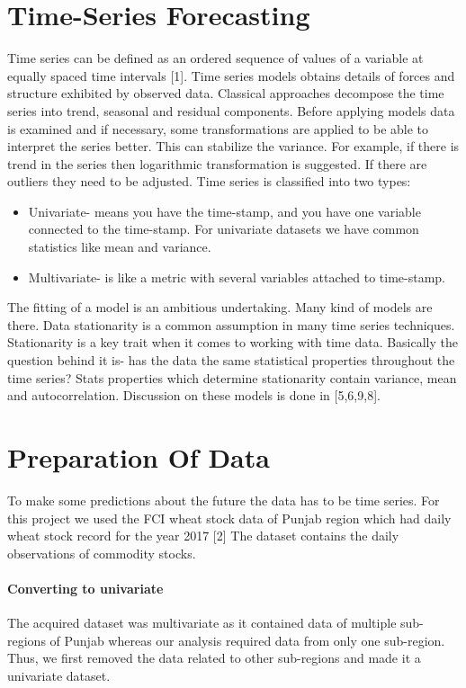 \documentclass[runningheads]{llncs}
\begin{document}
\section{Time-Series Forecasting}
Time series can be defined as an ordered sequence of values of a variable at equally spaced time intervals [1]. Time series models obtains details of forces and structure exhibited by observed data. Classical approaches decompose the time series into trend, seasonal and residual components. Before applying models data is examined and if necessary, some transformations are applied to be able to interpret the series better. This can stabilize the variance. For example, if there is trend in the series then logarithmic transformation is suggested. If there are outliers they need to be adjusted.
\linebreak Time series is classified into two types:
\begin{itemize}
\item Univariate- means you have the time-stamp, and you have one variable connected to the time-stamp. For univariate datasets we have common statistics like mean and variance.
\item Multivariate- is like a metric with several variables attached to time-stamp.
\end{itemize}
The fitting of a model is an ambitious undertaking. Many kind of models are there. Data stationarity is a common assumption in many time series techniques. Stationarity is a key trait when it comes to working with time data. Basically the question behind it is- has the data the same statistical properties throughout the time series? Stats properties which determine stationarity contain variance, mean and autocorrelation. Discussion on these models is done in [5,6,9,8].
%
%
%
\section{Preparation Of Data}
To make some predictions about the future the data has to be time series. For this project we used the FCI wheat stock data of Punjab region which had daily wheat stock record for the year 2017 [2] The dataset contains the daily observations of commodity stocks.
 \paragraph{Converting to univariate} The acquired dataset was multivariate as it contained data of multiple sub-regions of Punjab whereas our analysis required data from only one sub-region. Thus, we first removed the data related to other sub-regions and made it a univariate dataset. 
\end{document}
